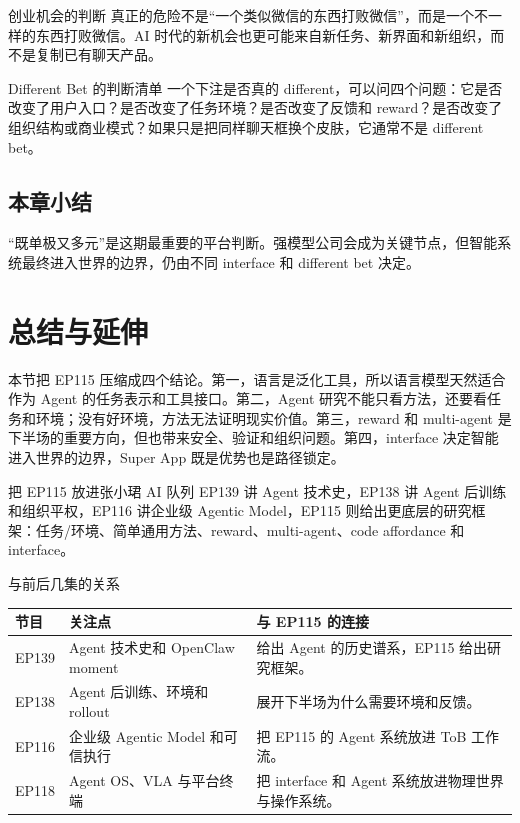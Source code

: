 \documentclass[a4paper]{article}
\begin{document}
\begin{importantbox}{创业机会的判断}
真正的危险不是“一个类似微信的东西打败微信”，而是一个不一样的东西打败微信。AI 时代的新机会也更可能来自新任务、新界面和新组织，而不是复制已有聊天产品。
\end{importantbox}

\begin{knowledgebox}{Different Bet 的判断清单}
一个下注是否真的 different，可以问四个问题：它是否改变了用户入口？是否改变了任务环境？是否改变了反馈和 reward？是否改变了组织结构或商业模式？如果只是把同样聊天框换个皮肤，它通常不是 different bet。
\end{knowledgebox}

\subsection{本章小结}

“既单极又多元”是这期最重要的平台判断。强模型公司会成为关键节点，但智能系统最终进入世界的边界，仍由不同 interface 和 different bet 决定。

\section{总结与延伸}

本节把 EP115 压缩成四个结论。第一，语言是泛化工具，所以语言模型天然适合作为 Agent 的任务表示和工具接口。第二，Agent 研究不能只看方法，还要看任务和环境；没有好环境，方法无法证明现实价值。第三，reward 和 multi-agent 是下半场的重要方向，但也带来安全、验证和组织问题。第四，interface 决定智能进入世界的边界，Super App 既是优势也是路径锁定。

\begin{importantbox}{把 EP115 放进张小珺 AI 队列}
EP139 讲 Agent 技术史，EP138 讲 Agent 后训练和组织平权，EP116 讲企业级 Agentic Model，EP115 则给出更底层的研究框架：任务/环境、简单通用方法、reward、multi-agent、code affordance 和 interface。
\end{importantbox}

\begin{knowledgebox}{与前后几集的关系}
\begin{tabularx}{\textwidth}{p{}p{}X}
\toprule
节目 & 关注点 & 与 EP115 的连接 \\
\midrule
EP139 & Agent 技术史和 OpenClaw moment & 给出 Agent 的历史谱系，EP115 给出研究框架。 \\
EP138 & Agent 后训练、环境和 rollout & 展开下半场为什么需要环境和反馈。 \\
EP116 & 企业级 Agentic Model 和可信执行 & 把 EP115 的 Agent 系统放进 ToB 工作流。 \\
EP118 & Agent OS、VLA 与平台终端 & 把 interface 和 Agent 系统放进物理世界与操作系统。 \\
\bottomrule
\end{tabularx}
\end{knowledgebox}
\end{document}
